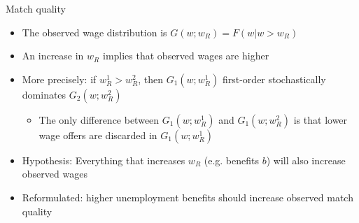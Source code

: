 \documentclass[9pt]{beamer}
\newcommand{\bit}{\begin{itemize}}
\newcommand{\eit}{\end{itemize}}
\newcommand{\bc}{\color{blue}}
\begin{document}
\begin{frame}{Match quality}

\bit
\setlength\itemsep{2em}

\item The observed wage distribution is $G(w; w_R) = F(w | w>w_R)$

\item An increase in $w_R$ implies that observed wages are higher

\item More precisely: if $w^1_R>w^2_R$, then $G_1(w; w^1_R)$ first-order stochastically dominates $G_2(w; w^2_R)$
\bit
	\item The only difference between $G_1(w; w^1_R)$ and $G_1(w; w^2_R)$ is that lower wage offers are discarded in $G_1(w; w^1_R)$
\eit

\item {\bc Hypothesis: Everything that increases $w_R$ (e.g. benefits $b$) will also increase observed wages}

\item Reformulated: higher unemployment benefits should increase observed {\bc match quality}

\eit


\end{frame}
\end{document}
